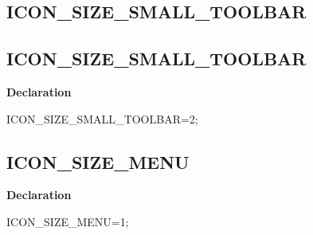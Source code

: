 \documentclass{report}
\newif\ifpdf
\begin{document}
\subsection*{\large{\textbf{ICON{\_}SIZE{\_}SMALL{\_}TOOLBAR}}\normalsize\hspace{1ex}\hrulefill}
\else
\subsection*{ICON{\_}SIZE{\_}SMALL{\_}TOOLBAR}
\fi
\label{common-ICON_SIZE_SMALL_TOOLBAR}
\begin{list}{}{
\setlength{\itemindent}{0cm}
\setlength{\listparindent}{0cm}
\setlength{\leftmargin}{\evensidemargin}
\addtolength{\leftmargin}{\tmplength}
\settowidth{\labelsep}{X}
\addtolength{\leftmargin}{\labelsep}
\setlength{\labelwidth}{\tmplength}
}
\item[\textbf{Declaration}\hfill]
\ifpdf
\begin{flushleft}
\fi
\begin{ttfamily}
ICON{\_}SIZE{\_}SMALL{\_}TOOLBAR=2;\end{ttfamily}

\ifpdf
\end{flushleft}
\fi

\end{list}
\ifpdf
\subsection*{\large{\textbf{ICON{\_}SIZE{\_}MENU}}\normalsize\hspace{1ex}\hrulefill}
\else
\subsection*{ICON{\_}SIZE{\_}MENU}
\fi
\label{common-ICON_SIZE_MENU}
\begin{list}{}{
\setlength{\itemindent}{0cm}
\setlength{\listparindent}{0cm}
\setlength{\leftmargin}{\evensidemargin}
\addtolength{\leftmargin}{\tmplength}
\settowidth{\labelsep}{X}
\addtolength{\leftmargin}{\labelsep}
\setlength{\labelwidth}{\tmplength}
}
\item[\textbf{Declaration}\hfill]
\ifpdf
\begin{flushleft}
\fi
\begin{ttfamily}
ICON{\_}SIZE{\_}MENU=1;\end{ttfamily}

\ifpdf
\end{flushleft}
\fi

\end{list}
\ifpdf
\end{document}

